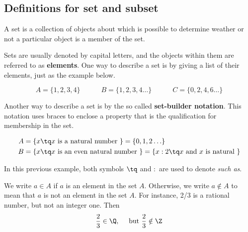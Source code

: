 
\subsection{Definitions for set and subset}
\begin{definition}
    A set is a collection of objects about which is possible to determine weather or not a particular object is a member of the set.
\end{definition}

Sets are usually denoted by capital letters, and the objects within them are referred to as \textbf{elements}. One way to describe a set is by giving a list of their elements, just as the example below.
\begin{example}
    \begin{equation}
        A = \lbrace 1, 2, 3, 4\rbrace \quad\quad\quad B = \lbrace 1, 2, 3, 4\ldots\rbrace \quad\quad\quad C = \lbrace 0, 2, 4, 6\ldots\rbrace
    \end{equation}
\end{example}

Another way to describe a set is by the so called \textbf{set-builder notation}. This notation uses braces to enclose a property that is the qualification for membership in the set.

\begin{example}
    \begin{align}
        A &= \lbrace x\tq x \textrm{ is a natural number } \rbrace = \lbrace 0, 1, 2\ldots\rbrace \\
        B &= \lbrace x\tq x \textrm{ is an even natural number } \rbrace = \lbrace x : 2\tq x \textrm{ and $x$ is natural } \rbrace
    \end{align}
\end{example}

\begin{note}
    In this previous example, both symbols $\tq$ and $ : $ are used to denote \textit{such as}.
\end{note}

We write $a\in A$ if $a$ is an element in the set $A$. Otherwise, we write $a\notin A$ to mean that $a$ is not an element in the set $A$. For instance, 2/3 is a rational number, but not an integer one. Then
\begin{equation}
    \frac{2}{3}\in\Q,\quad\textrm{ but } \frac{2}{3}\notin\Z 
\end{equation}

